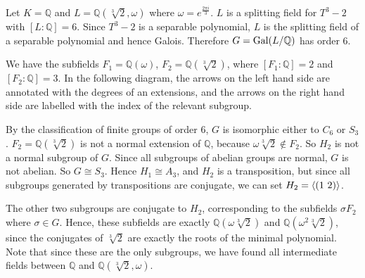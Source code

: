\begin{example}
	Let \( K = \mathbb Q \) and \( L = \mathbb Q(\sqrt[3]{2}, \omega) \) where \( \omega = e^{\frac{2\pi i}{3}} \).
	\( L \) is a splitting field for \( T^3 - 2 \) with \( [L : \mathbb Q] = 6 \).
	Since \( T^3 - 2 \) is a separable polynomial, \( L \) is the splitting field of a separable polynomial and hence Galois.
	Therefore \( G = \operatorname{Gal}(L/\mathbb Q) \) has order 6.

	We have the subfields \( F_1 = \mathbb Q(\omega) \), \( F_2 = \mathbb Q(\sqrt[3]{2}) \), where \( [F_1 : \mathbb Q] = 2 \) and \( [F_2 : \mathbb Q] = 3 \).
	In the following diagram, the arrows on the left hand side are annotated with the degrees of an extensions, and the arrows on the right hand side are labelled with the index of the relevant subgroup.
	\begin{center}
	\end{center}
	By the classification of finite groups of order 6, \( G \) is isomorphic either to \( C_6 \) or \( S_3 \).
	\( F_2 = \mathbb Q(\sqrt[3]{2}) \) is not a normal extension of \( \mathbb Q \), because \( \omega\sqrt[3]{2} \not\in F_2 \).
	So \( H_2 \) is not a normal subgroup of \( G \).
	Since all subgroups of abelian groups are normal, \( G \) is not abelian.
	So \( G \cong S_3 \).
	Hence \( H_1 \cong A_3 \), and \( H_2 \) is a transposition, but since all subgroups generated by transpositions are conjugate, we can set \( H_2 = \genset{(1\ 2)} \).

	The other two subgroups are conjugate to \( H_2 \), corresponding to the subfields \( \sigma F_2 \) where \( \sigma \in G \).
	Hence, these subfields are exactly \( \mathbb Q(\omega\sqrt[3]{2}) \) and \( \mathbb Q(\omega^2\sqrt[3]{2}) \), since the conjugates of \( \sqrt[3]{2} \) are exactly the roots of the minimal polynomial.
	Note that since these are the only subgroups, we have found all intermediate fields between \( \mathbb Q \) and \( \mathbb Q(\sqrt[3]{2},\omega) \).
\end{example}
